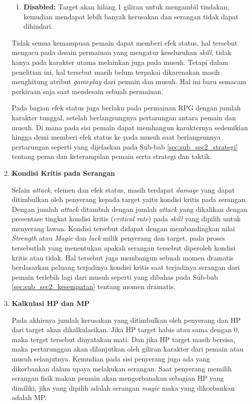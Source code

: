 \begin{enumerate}[label=\textbf{\arabic*).}]
\begin{enumerate}[label=\alph*).]
		\item \textbf{Disabled:} Target akan hilang 1 giliran untuk mengambil tindakan, kemudian mendapat lebih banyak kerusakan dan serangan tidak dapat dihindari.
	\end{enumerate}
	
	Tidak semua kemampuan pemain dapat memberi efek status, hal tersebut mengacu pada desain permainan yang mengatur keseluruhan \textit{skill}, tidak hanya pada karakter utama melainkan juga pada musuh. Tetapi dalam penelitian ini, hal tersebut masih belum terpakai dikarenakan masih menghitung atribut \textit{gameplay} dari pemain dan musuh. Hal ini baru semacam perkiraan saja saat mendesain sebuah permainan.
	\vspace{1ex}
	
	Pada bagian efek status juga berlaku pada permainan RPG dengan jumlah karakter tunggal, setelah berlangsungnya pertarungan antara pemain dan musuh. Di mana pada sisi pemain dapat memhangun karakternya sedemikian hingga demi memberi efek status ke pada musuh saat berlangsunnya pertarungan seperti yang dijelaskan pada Sub-bab \ref{sec:sub_sec2_strategi} tentang peran dan keterampilan pemain serta strategi dan taktik.
	
	\item \textbf{Kondisi Kritis pada Serangan}
	
	Selain \textit{attack}, elemen dan efek status, masih terdapat \textit{damage} yang dapat ditimbulkan oleh penyerang kepada target yaitu kondisi kritis pada serangan. Dengan jumlah \textit{attack} ditambah dengan jumlah \textit{attack} yang dikalikan dengan presentase tingkat kondisi kritis (\textit{critical rate}) pada \textit{skill} yang dipilih untuk menyerang lawan. Kondisi tersebut didapat dengan membandingkan nilai \textit{Strength} atau \textit{Magic} dan \textit{luck} milik penyerang dan target, pada proses tersebutlah yang menentukan apakah serangan tersebut diperoleh kondisi kritis atau tidak. Hal tersebut juga membangun sebuah momen dramatis berdasarkan peluang terjadinya kondisi kritis saat terjadinya serangan dari pemain terlebih lagi dari musuh seperti yang dibahas pada Sub-bab \ref{sec:sub_sec2_kesempatan} tentang momen dramatis.
	
	\item \textbf{Kalkulasi HP dan MP}
	
	Pada akhirnya jumlah kerusakan yang ditimbulkan oleh penyerang dan HP dari target akan dikalkulasikan. Jika HP target habis atau sama dengan 0, maka terget tersebut dinyatakan mati. Dan jika HP target masih bersisa, maka pertarunggan akan dilanjutkan oleh giliran karakter dari pemain atau musuh selanjutnya. Kemudian pada sisi penyerang juga ada yang dikorbankan dalam upaya melakukan serangan. Saat penyerang memilih serangan fisik makan pemain akan mengorbanakan sebagian HP yang dimiliki, jika yang dipilih adalah serangan \textit{magic} maka yang dikorbankan adalah MP.
\end{enumerate}

